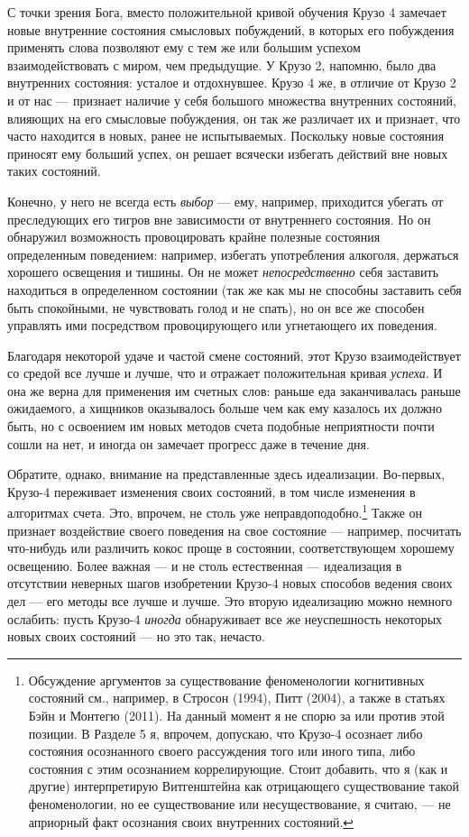 \documentclass[11pt]{book}
\begin{document}
С точки зрения Бога, вместо положительной кривой обучения Крузо 4 замечает новые внутренние состояния смысловых побуждений, в которых его побуждения применять слова позволяют ему с тем же или большим успехом взаимодействовать с миром, чем предыдущие. У Крузо 2, напомню, было два внутренних состояния: усталое и отдохнувшее. Крузо 4 же, в отличие от Крузо 2 и от нас --- признает наличие у себя большого множества внутренних состояний, влияющих на его смысловые побуждения, он так же различает их и признает, что часто находится в новых, ранее не испытываемых. Поскольку новые состояния приносят ему больший успех, он решает всячески избегать действий вне новых таких состояний.

Конечно, у него не всегда есть \textit{выбор} --- ему, например, приходится убегать от преследующих его тигров вне зависимости от внутреннего состояния. Но он обнаружил возможность провоцировать крайне полезные состояния определенным поведением: например, избегать употребления алкоголя, держаться хорошего освещения и тишины. Он не может \textit{непосредственно} себя заставить находиться в определенном состоянии (так же как мы не способны заставить себя быть спокойными, не чувствовать голод и не спать), но он все же способен управлять ими посредством провоцирующего или угнетающего их поведения.

Благодаря некоторой удаче и частой смене состояний, этот Крузо взаимодействует со средой все лучше и лучше, что и отражает положительная кривая \textit{успеха}. И она же верна для применения им счетных слов: раньше еда заканчивалась раньше ожидаемого, а хищников оказывалось больше чем как ему казалось их должно быть, но с освоением им новых методов счета подобные неприятности почти сошли на нет, и иногда он замечает прогресс даже в течение дня.

Обратите, однако, внимание на представленные здесь идеализации. Во-первых, Крузо-4 переживает изменения своих состояний, в том числе изменения в алгоритмах счета. Это, впрочем, не столь уже неправдоподобно.\footnote{Обсуждение аргументов за существование феноменологии когнитивных состояний см., например, в Стросон (1994), Питт (2004), а также в статьях Бэйн и Монтегю (2011). На данный момент я не спорю за или против этой позиции. В Разделе 5 я, впрочем, допускаю, что Крузо-4 осознает либо состояния осознанного своего рассуждения того или иного типа, либо состояния с этим осознанием коррелирующие. Стоит добавить, что я (как и другие) интерпретирую Витгенштейна как отрицающего существование такой феноменологии, но ее существование или несуществование, я считаю, --- не априорный факт осознания своих внутренних состояний.} Также он признает воздействие своего поведения на свое состояние --- например, посчитать что-нибудь или различить кокос проще в состоянии, соответствующем хорошему освещению. Более важная --- и не столь естественная --- идеализация в отсутствии неверных шагов изобретении Крузо-4 новых способов ведения своих дел --- его методы все лучше и лучше. Это вторую идеализацию можно немного ослабить: пусть Крузо-4 \textit{иногда} обнаруживает все же неуспешность некоторых новых своих состояний --- но это так, нечасто.
\end{document}
